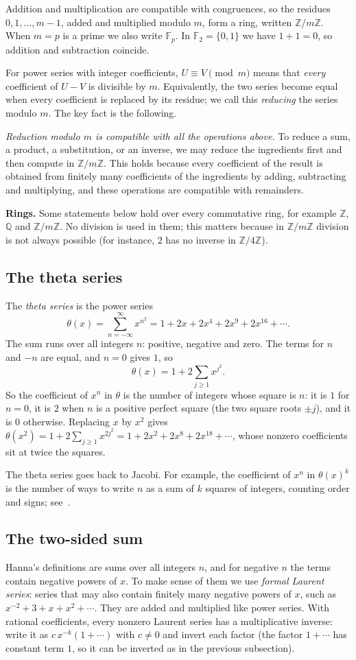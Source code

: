 \documentclass[11pt,a4paper]{article}
\theoremstyle{definition}
\theoremstyle{remark}
\newcommand{\Z}{\mathbb{Z}}
\newcommand{\Q}{\mathbb{Q}}
\newcommand{\F}{\mathbb{F}}
\newcommand{\para}[1]{\par\medskip\noindent\textbf{#1}\enspace}
\begin{document}
Addition and multiplication are compatible with congruences, so the residues $0,1,\dots,m-1$, added and multiplied
modulo $m$, form a ring, written $\Z/m\Z$. When $m=p$ is a prime we also write $\F_p$. In $\F_2=\{0,1\}$ we have $1+1=0$,
so addition and subtraction coincide.

For power series with integer coefficients, $U\equiv V\pmod m$ means that \emph{every} coefficient of $U-V$ is
divisible by $m$. Equivalently, the two series become equal when every coefficient is replaced by its residue; we call
this \emph{reducing} the series modulo $m$. The key fact is the following.

\emph{Reduction modulo $m$ is compatible with all the operations above.} To reduce a sum, a product, a substitution, or
an inverse, we may reduce the ingredients first and then compute in $\Z/m\Z$. This holds because every
coefficient of the result is obtained from finitely many coefficients of the ingredients by adding, subtracting and
multiplying, and these operations are compatible with remainders.

\para{Rings.} Some statements below hold over every commutative ring, for example $\Z$, $\Q$ and $\Z/m\Z$. No
division is used in them; this matters because in $\Z/m\Z$ division is not always possible (for instance, $2$ has no inverse in
$\Z/4\Z$).

\subsection{The theta series}
The \emph{theta series} is the power series
\[
\theta(x)=\sum_{n=-\infty}^{\infty}x^{n^2}=1+2x+2x^4+2x^9+2x^{16}+\cdots .
\]
The sum runs over all integers $n$: positive, negative and zero. The terms for $n$ and $-n$ are equal, and $n=0$
gives $1$, so
\[
\theta(x)=1+2\sum_{j\ge1}x^{j^2}.
\]
So the coefficient of $x^n$ in $\theta$ is the number of integers whose square is $n$: it is $1$ for $n=0$, it is $2$
when $n$ is a positive perfect square (the two square roots $\pm j$), and it is $0$ otherwise. Replacing $x$ by $x^2$
gives $\theta(x^2)=1+2\sum_{j\ge1}x^{2j^2}=1+2x^2+2x^8+2x^{18}+\cdots$, whose nonzero coefficients sit at twice the
squares.

The theta series goes back to Jacobi. For example, the
coefficient of $x^n$ in $\theta(x)^k$ is the number of ways to write $n$ as a sum of $k$ squares of integers,
counting order and signs; see~\cite{grosswald}.

\subsection{The two-sided sum}\label{sec:fold}
Hanna's definitions are sums over all integers $n$, and for negative $n$ the terms contain negative powers of $x$. To
make sense of them we use \emph{formal Laurent series}: series that may also contain finitely many negative powers of
$x$, such as $x^{-2}+3+x+x^2+\cdots$. They are added and multiplied like power series. With rational coefficients,
every nonzero Laurent series has a multiplicative inverse: write it as $c\,x^{-k}(1+\cdots)$ with $c\ne0$ and invert
each factor (the factor $1+\cdots$ has constant term $1$, so it can be inverted as in the previous subsection).
\end{document}
